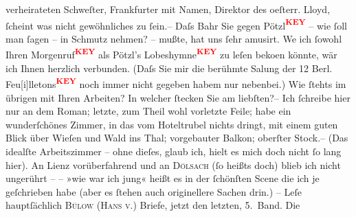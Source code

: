 \begin{ledgroupsized}[t]{13cm}
               verheirateten Schweſter, Frankfurter mit Namen, Direktor {\pb}des oeſterr. Lloyd, ſcheint was nicht gewöhnliches zu ſein.– Daſs Bahr Sie gegen Pötzl\textcolor{red}{\textsuperscript{\textbf{KEY}}} – wie ſoll man ſagen – in Schmutz nehmen? – mußte, hat uns ſehr
               amusirt. We{\geminationn} ich ſowohl Ihren Morgenruf\textcolor{red}{\textsuperscript{\textbf{KEY}}} als Pötzl’s Lobeshymne\textcolor{red}{\textsuperscript{\textbf{KEY}}} zu leſen beko{\geminationm}en könnte, wär ich Ihnen herzlich verbunden. (Daſs Sie mir die berühmte Sa{\geminationm}lung der 12
                     Berl. Feu{[}i{]}lletons\textcolor{red}{\textsuperscript{\textbf{KEY}}}
               noch immer nicht gegeben habem nur nebenbei.) Wie ſtehts im übrigen mit Ihren
               Arbeiten? In welcher ſtecken Sie am liebſten?– Ich ſchreibe hier nur an dem Roman; letzte, zum Theil wohl
               {\pb}vorletzte Feile; habe ein
               wunderſchönes Zimmer, in das vom Hoteltrubel nichts dringt, mit einem guten Blick
               über Wieſen und Wald ins Thal; vorgebauter Balkon; oberſter Stock.– (Das idealſte
               Arbeitszimmer – ohne dieſes, glaub ich, hielt es mich doch nicht ſo lang hier). An
                  Lienz vorüberfahrend und an \textsc{Dölsach} (ſo heißts doch) blieb ich nicht ungerührt – – »wie war ich jung« heißt es in
               der ſchönſten Scene die ich je geſchrieben habe (aber es ſtehen auch originellere
               Sachen drin.) – Leſe hauptſächlich \textsc{Bülow (Hans v.}) Briefe, jetzt den letzten, 5. Band. Die

\end{ledgroupsized}

